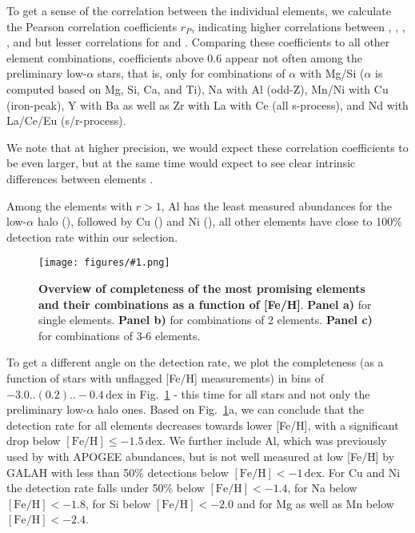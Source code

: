 \documentclass[fleqn,usenatbib]{mnras}
\newcommand{\dex}{\,\mathrm{dex}}	%
\newcommand{\codeicon}{{\faCloudDownload}}
\newcommand{\codelink}[1]{\href{https://github.com/svenbuder/Accreted-stars-in-GALAH-DR3/tree/main/figures/#1.ipynb}{\codeicon}\,\,}
\newcommand{\oscaption}[2]{\caption{#2 \codelink{#1}}}
\newcommand{\figurecolumnwidth}[3]{\begin{figure} \centering \texttt{[image: figures/\#1.png]}\oscaption{#2}{#3}\label{fig:#1} \end{figure}}
\begin{document}
To get a sense of the correlation between the individual elements, we calculate the Pearson correlation coefficients $r_P$, indicating higher correlations between , , , , and  but lesser correlations for  and . Comparing these coefficients to all other element combinations, coefficients above 0.6 appear not often among the preliminary low-$\alpha$ stars, that is, only for combinations of $\alpha$ with Mg/Si ($\alpha$ is computed based on Mg, Si, Ca, and Ti), Na with Al (odd-Z), Mn/Ni with Cu (iron-peak), Y with Ba as well as Zr with La with Ce (all s-process), and Nd with La/Ce/Eu (s/r-process).

We note that at higher precision, we would expect these correlation coefficients to be even larger, but at the same time would expect to see clear intrinsic differences between elements \citep[e.g.][]{Blancato2019, Ting2021}.

Among the elements with $r > 1$, Al has the least measured abundances for the low-$\alpha$ halo (), followed by Cu () and Ni (), all other elements have close to 100\% detection rate within our selection. 

\figurecolumnwidth{Completeness_Combinations}{gaussian_mixture_models}{
\textbf{Overview of completeness of the most promising elements and their combinations as a function of [Fe/H]}.
\textbf{Panel a)} for single elements.
\textbf{Panel b)} for combinations of 2 elements.
\textbf{Panel c)} for combinations of 3-6 elements.
}

To get a different angle on the detection rate, we plot the completeness (as a function of stars with unflagged [Fe/H] measurements) in bins of $-3.0..(0.2)..-0.4\,\mathrm{dex}$ in Fig.~\ref{fig:Completeness_Combinations} - this time for all stars and not only the preliminary low-$\alpha$ halo ones. Based on Fig.~\ref{fig:Completeness_Combinations}a, we can conclude that the detection rate for all elements decreases towards lower [Fe/H], with a significant drop below $\mathrm{[Fe/H]} \leq -1.5\dex$. We further include Al, which was previously used by \citet{Das2020} with APOGEE abundances, but is not well measured at low [Fe/H] by GALAH with less than 50\% detections below $\mathrm{[Fe/H]} < -1\dex$. For Cu and Ni the detection rate falls under 50\% below $\mathrm{[Fe/H]} < -1.4$, for Na below $\mathrm{[Fe/H]} < -1.8$, for Si below $\mathrm{[Fe/H]} < -2.0$ and for Mg as well as Mn below $\mathrm{[Fe/H]} < -2.4$.
\end{document}
